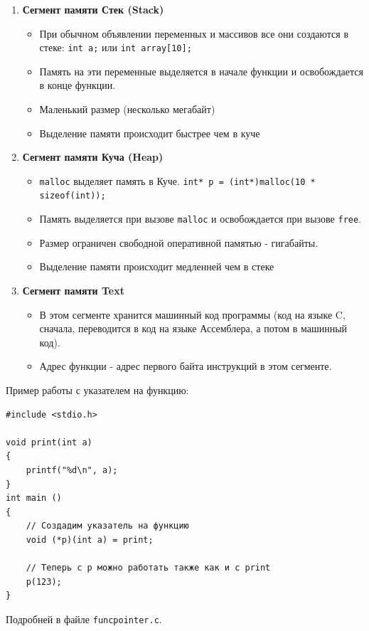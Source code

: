 \documentclass{article}
\begin{document}
\begin{enumerate}
\item \textbf{Сегмент памяти Стек (Stack)} \\
\begin{itemize}
\item При обычном объявлении переменных и массивов все они создаются в стеке: \texttt{int a;} или \texttt{int array[10];}
\item Память на эти переменные выделяется в начале функции и освобождается в конце функции.
\item Маленький размер (несколько мегабайт)
\item Выделение памяти происходит быстрее чем в куче
\end{itemize}
\item \textbf{Сегмент памяти Куча (Heap)} \\
\begin{itemize}
\item \texttt{malloc} выделяет память в Куче. \texttt{int* p = (int*)malloc(10 * sizeof(int));}
\item Память выделяется при вызове \texttt{malloc} и освобождается при вызове \texttt{free}.
\item Размер ограничен свободной оперативной памятью - гигабайты.
\item Выделение памяти происходит медленней чем в стеке
\end{itemize}
\item \textbf{Сегмент памяти Text} \\
\begin{itemize}
\item В этом сегменте хранится машинный код программы (код на языке C, сначала, переводится в код на языке Ассемблера, а потом в машинный код).
\item Адрес функции - адрес первого байта инструкций в этом сегменте.
\end{itemize}
\end{enumerate}

Пример работы с указателем на функцию:
\begin{lstlisting}
#include <stdio.h>

void print(int a)
{
    printf("%d\n", a);
}
int main ()
{
    // Создадим указатель на функцию
    void (*p)(int a) = print;
    
    // Теперь с p можно работать также как и с print
    p(123);
}
\end{lstlisting}
Подробней в файле \texttt{funcpointer.c}.
\end{document}

